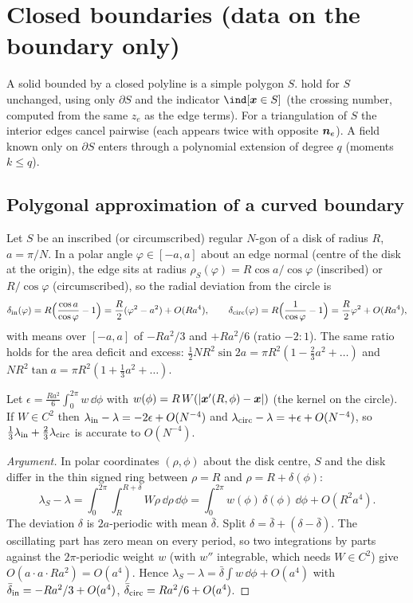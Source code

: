 \section{Closed boundaries (data on the boundary only)}\label{sec:closed}

A solid bounded by a closed polyline is a simple polygon $S$.  hold
for $S$ unchanged, using only $\partial S$ and the indicator $\ind[\xx\in S]$ (the crossing number, computed from the same
$z_e$ as the edge terms). For a triangulation of $S$ the interior edges cancel pairwise (each appears twice with opposite
$\bm n_e$). A field known only on $\partial S$ enters through a polynomial extension of degree $q$ (moments $k\le q$).

\subsection{Polygonal approximation of a curved boundary}
Let $S$ be an inscribed (or circumscribed) regular $N$-gon of a disk of radius $R$, $a=\pi/N$.
In a polar angle $\varphi\in[-a,a]$ about an edge normal (centre of the disk at the origin), the edge sits at radius $\rho_S(\varphi)=R\cos a/\cos\varphi$ (inscribed)
or $R/\cos\varphi$ (circumscribed), so the radial deviation from the circle is
\[
 \delta_{\rm in}(\varphi)=R\Big(\frac{\cos a}{\cos\varphi}-1\Big)=\frac R2(\varphi^2-a^2)+O(Ra^4),\qquad
 \delta_{\rm circ}(\varphi)=R\Big(\frac1{\cos\varphi}-1\Big)=\frac R2\varphi^2+O(Ra^4),
\]
with means over $[-a,a]$ of $-Ra^2/3$ and $+Ra^2/6$ (ratio $-2:1$). The same ratio holds for the area deficit and excess:
$\frac12NR^2\sin2a=\pi R^2(1-\frac23a^2+\dots)$ and $NR^2\tan a=\pi R^2(1+\frac13a^2+\dots)$.
\begin{proposition}\label{prop:ngon}
Let $\epsilon=\frac{Ra^2}{6}\int_0^{2\pi}w\,\dd\phi$ with $w(\phi)=R\,W(|\bm x'(R,\phi)-\bm x|)$ (the kernel on the circle). If $W\in C^2$ then
$\lambda_{\rm in}-\lambda=-2\epsilon+O(N^{-4})$ and $\lambda_{\rm circ}-\lambda=+\epsilon+O(N^{-4})$, so
$\tfrac13\lambda_{\rm in}+\tfrac23\lambda_{\rm circ}$ is accurate to $O(N^{-4})$. 
\end{proposition}
\begin{proof}[Argument]
In polar coordinates $(\rho,\phi)$ about the disk centre, $S$ and the disk differ in the thin signed ring between $\rho=R$ and $\rho=R+\delta(\phi)$:
\[
 \lambda_S-\lambda=\int_0^{2\pi}\!\!\int_R^{R+\delta}W\rho\,\dd\rho\,\dd\phi=\int_0^{2\pi}w(\phi)\,\delta(\phi)\,\dd\phi+O(R^2a^4).
\]
The deviation $\delta$ is $2a$-periodic with mean $\bar\delta$. Split $\delta=\bar\delta+(\delta-\bar\delta)$. The oscillating part has zero mean on every period, so
two integrations by parts against the $2\pi$-periodic weight $w$ (with $w''$ integrable, which needs $W\in C^2$) give $O(a\cdot a\cdot Ra^2)=O(a^4)$.
Hence $\lambda_S-\lambda=\bar\delta\int w\,\dd\phi+O(a^4)$ with $\bar\delta_{\rm in}=-Ra^2/3+O(a^4)$, $\bar\delta_{\rm circ}=Ra^2/6+O(a^4)$.
\end{proof}
